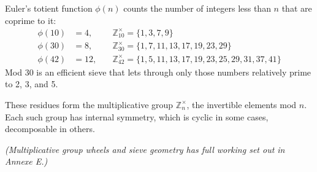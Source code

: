 \begin{tcolorbox}[title=Euler's Totient and Prime Sieves, colback=gray!5, colframe=gray!80!black, fonttitle=\bfseries]
Euler's totient function $\phi(n)$ counts the number of integers less than $n$ that are coprime to it:
\[
\begin{aligned}
\phi(10) &= 4, \quad &\mathbb{Z}_{10}^\times = \{1, 3, 7, 9\} \\
\phi(30) &= 8, \quad &\mathbb{Z}_{30}^\times = \{1, 7, 11, 13, 17, 19, 23, 29\} \\
\phi(42) &= 12, \quad &\mathbb{Z}_{42}^\times = \{1, 5, 11, 13, 17, 19, 23, 25, 29, 31, 37, 41\}
\end{aligned}
\]
Mod 30 is an efficient sieve that lets through only those numbers relatively prime to 2, 3, and 5.
\end{tcolorbox}

These residues form the multiplicative group \( \mathbb{Z}_n^\times \), the invertible elements mod \( n \). Each such group has internal symmetry, which is cyclic in some cases, decomposable in others.
\vspace{1em}

\textit{(Multiplicative group wheels and sieve geometry has full working set out in Annexe E.)}

